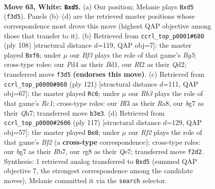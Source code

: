 \documentclass[11pt]{article}
\begin{document}
\clearpage

\begin{figure}[p]\centering
\begin{subfigure}{0.46\textwidth}\centering
\resizebox{\linewidth}{!}{%
\newchessgame
\chessboard[
  setfen={rn1qk1r1/4n1b1/6p1/3p2P1/1N1P1P1p/1R3B1P/1BQ2R1K/8 w - - 15 63},
  showmover=false,
  pgfstyle=straightmove, color=movearrow, markmove={f3-d5}
]}
\caption{}
\end{subfigure}\hfill
\begin{subfigure}{0.46\textwidth}\centering
\resizebox{\linewidth}{!}{%
\newchessgame
\chessboard[
  setfen={7k/4qbbr/3p1nR1/1pp1p1B1/4P3/5PRP/3Q3K/3B4 w - - 11 55},
  showmover=false,
  pgfstyle=straightmove, color=movearrow, markmove={g5-f6}
]}
\caption{}
\end{subfigure}
\\[4pt]
\begin{subfigure}{0.46\textwidth}\centering
\resizebox{\linewidth}{!}{%
\newchessgame
\chessboard[
  setfen={r1r2b1k/7q/P4pp1/2n2b2/4pP2/4Q3/4PNBP/R2R2NK b - - 4 61},
  showmover=false,
  pgfstyle=straightmove, color=movearrow, markmove={c8-c6}
]}
\caption{}
\end{subfigure}\hfill
\begin{subfigure}{0.46\textwidth}\centering
\resizebox{\linewidth}{!}{%
\newchessgame
\chessboard[
  setfen={6k1/1r2qbn1/4p2r/3pP3/3N4/1P1B2QP/2N3R1/1K6 b - - 22 59},
  showmover=false,
  pgfstyle=straightmove, color=movearrow, markmove={f7-e8}
]}
\caption{}
\end{subfigure}
\caption{\textbf{Move 63, White: \texttt{Bxd5}.} (a) Our position; Melanie plays \texttt{Bxd5} (\texttt{f3d5}). Panels (b)--(d) are the retrieved master positions whose correspondence most drove this move (highest QAP objective among those that transfer to it). (b) Retrieved from \texttt{ccrl\_top\_p0001\#680} (ply 108) [structural distance $d$=119, QAP obj=7]: the master played \texttt{Bxf6}; under $\mu$ our \emph{Bf3} plays the role of that game's \emph{Bg5}; cross-type roles: our \emph{P}d4 as their \emph{B}d1, our \emph{R}f2 as their \emph{Q}d2; transferred move \texttt{f3d5} \textbf{(endorses this move)}. (c) Retrieved from \texttt{ccrl\_top\_p0000\#860} (ply 121) [structural distance $d$=111, QAP obj=67]: the master played \texttt{Rc6}; under $\mu$ our \emph{Rb3} plays the role of that game's \emph{Rc1}; cross-type roles: our \emph{B}f3 as their \emph{R}a8, our \emph{b}g7 as their \emph{Q}h7; transferred move \texttt{b3e3}. (d) Retrieved from \texttt{ccrl\_top\_p0000\#2606} (ply 117) [structural distance $d$=129, QAP obj=57]: the master played \texttt{Be8}; under $\mu$ our \emph{Rf2} plays the role of that game's \emph{Bf2} (a \textbf{cross-type} correspondence); cross-type roles: our \emph{b}g7 as their \emph{R}b7, our \emph{r}g8 as their \emph{Q}e7; transferred move \texttt{f2d2}. Synthesis: 1 retrieved analog transferred to \texttt{Bxd5} (summed QAP objective 7, the strongest correspondence among the candidate moves); Melanie committed it via the \texttt{search} selector.}
\label{fig:thought-m124}
\end{figure}
\end{document}
